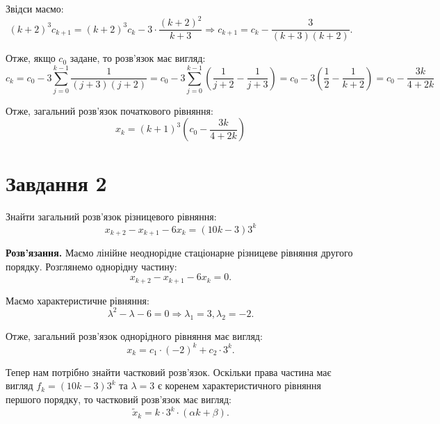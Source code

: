 \documentclass{hw_template}
\begin{document}
Звідси маємо:
\begin{equation*}
    (k+2)^3c_{k+1} = (k+2)^3c_k - 3 \cdot \frac{(k+2)^2}{k+3} \Rightarrow c_{k+1} = c_k - \frac{3}{(k+3)(k+2)}. 
\end{equation*}

Отже, якщо $c_0$ задане, то розв'язок має вигляд:
\begin{equation*}
    c_k = c_0 - 3\sum_{j=0}^{k-1}\frac{1}{(j+3)(j+2)} = c_0 - 3\sum_{j=0}^{k-1}\left(\frac{1}{j+2} - \frac{1}{j+3}\right) = c_0-3\left(\frac{1}{2}-\frac{1}{k+2}\right) = c_0 - \frac{3k}{4+2k}
\end{equation*}

Отже, загальний розв'язок початкового рівняння:
\begin{equation*}
    \boxed{x_k = (k+1)^3\left(c_0 - \frac{3k}{4+2k}\right)}
\end{equation*}

\pagebreak

\section{Завдання 2}

\begin{problem}
    Знайти загальний розв'язок різницевого рівняння:
    \begin{equation*}
        x_{k+2} - x_{k+1} - 6x_k = (10k-3)3^k
    \end{equation*}
\end{problem}

\textbf{Розв'язання.} Маємо лінійне неоднорідне стаціонарне різницеве рівняння
другого порядку. Розглянемо однорідну частину:
\begin{equation*}
    x_{k+2} - x_{k+1} - 6x_k = 0.
\end{equation*}

Маємо характеристичне рівняння:
\begin{equation*}
    \lambda^2 - \lambda - 6 = 0 \Rightarrow \lambda_1 = 3, \lambda_2 = -2.
\end{equation*}

Отже, загальний розв'язок однорідного рівняння має вигляд:
\begin{equation*}
    x_k = c_1 \cdot (-2)^k + c_2 \cdot 3^k.
\end{equation*}

Тепер нам потрібно знайти частковий розв'язок. Оскільки права частина має вигляд $f_k = (10k-3)3^k$ та $\lambda=3$ є коренем характеристичного рівняння першого порядку, то частковий розв'язок має вигляд:
\begin{equation*}
    \widetilde{x}_k = k \cdot 3^k \cdot (\alpha k+\beta).
\end{equation*}
\end{document}
